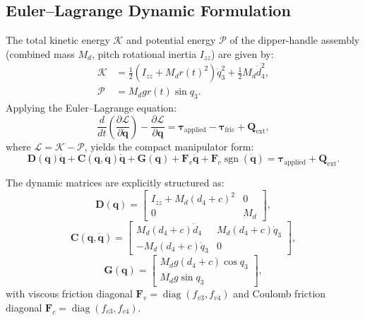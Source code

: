 \documentclass[journal]{IEEEtran}
\begin{document}
\subsection{Euler--Lagrange Dynamic Formulation}
The total kinetic energy $\mathcal{K}$ and potential energy $\mathcal{P}$ of the dipper-handle assembly (combined mass $M_d$, pitch rotational inertia $I_{zz}$) are given by:
\begin{align}
\mathcal{K} &= \frac{1}{2}\left(I_{zz} + M_d r(t)^2\right)\dot{q}_3^2 + \frac{1}{2}M_d \dot{d}_4^2, \label{eq:kinetic} \\
\mathcal{P} &= M_d g r(t) \sin q_3. \label{eq:potential}
\end{align}
Applying the Euler--Lagrange equation:
\begin{equation}
\frac{d}{dt}\left(\frac{\partial \mathcal{L}}{\partial \dot{\bm{q}}}\right) - \frac{\partial \mathcal{L}}{\partial \bm{q}} = \bm{\tau}_{\mathrm{applied}} - \bm{\tau}_{\mathrm{fric}} + \bm{Q}_{\mathrm{ext}},
\end{equation}
where $\mathcal{L} = \mathcal{K} - \mathcal{P}$, yields the compact manipulator form:
\begin{equation}
\bm{D}(\bm{q})\ddot{\bm{q}} + \bm{C}(\bm{q},\dot{\bm{q}})\dot{\bm{q}} + \bm{G}(\bm{q}) + \bm{F}_v \dot{\bm{q}} + \bm{F}_c \operatorname{sgn}(\dot{\bm{q}}) = \bm{\tau}_{\mathrm{applied}} + \bm{Q}_{\mathrm{ext}}.
\label{eq:manipulator_eq}
\end{equation}

The dynamic matrices are explicitly structured as:
\begin{equation}
\bm{D}(\bm{q}) = \begin{bmatrix} I_{zz} + M_d (d_4+c)^2 & 0 \\ 0 & M_d \end{bmatrix},
\label{eq:inertia_mat}
\end{equation}
\begin{equation}
\bm{C}(\bm{q},\dot{\bm{q}}) = \begin{bmatrix} M_d(d_4+c)\dot{d}_4 & M_d(d_4+c)\dot{q}_3 \\ -M_d(d_4+c)\dot{q}_3 & 0 \end{bmatrix},
\label{eq:coriolis_mat}
\end{equation}
\begin{equation}
\bm{G}(\bm{q}) = \begin{bmatrix} M_d g (d_4+c)\cos q_3 \\ M_d g \sin q_3 \end{bmatrix},
\label{eq:gravity_vec}
\end{equation}
with viscous friction diagonal $\bm{F}_v = \operatorname{diag}(f_{v3}, f_{v4})$ and Coulomb friction diagonal $\bm{F}_c = \operatorname{diag}(f_{c3}, f_{c4})$.
\end{document}
